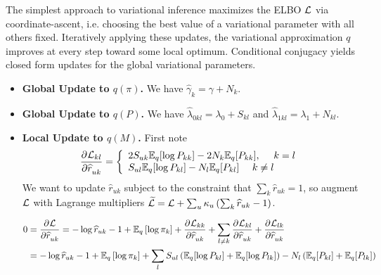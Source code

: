\documentclass{article}
\begin{document}
\newpage

 The simplest approach to variational inference maximizes the ELBO $\mathcal{L}$ via coordinate-ascent, i.e. choosing the best value of a variational parameter with all others fixed. Iteratively applying these updates, the variational approximation $q$ improves at every step toward some local optimum. Conditional conjugacy yields closed form updates for the global variational parameters. 

\begin{itemize}
\item {\bf Global Update to $q(\pi)$.} We have $\widehat \gamma_{k} = \gamma + N_k$.
\item {\bf Global Update to $q(P)$.} We have $\widehat \lambda_{0kl} = \lambda_0 + S_{kl}$ and $\widehat \lambda_{1kl} = \lambda_1 + N_{kl}$.
\item {\bf Local Update to $q(M)$.} First note 
$$ 
\frac{\partial^{}\mathcal{L}_{kl}}{\partial \widehat r_{uk}^{}} 
= \left\{
                \begin{array}{ll}
2S_{uk}\mathbb{E}_q[\log P_{kk}]
   - 2N_k \mathbb{E}_q[P_{kk}],
  ~~~~ k=l \\
S_{ul} \mathbb{E}_q[\log P_{kl}] - N_l\mathbb{E}_q[P_{kl}]
  ~~~~ k\neq l
                \end{array}
              \right.
$$
We want to update $\widehat r_{uk}$ subject to the constraint that $\sum_k \widehat r_{uk} = 1$, so augment $\mathcal{L}$ with Lagrange multipliers $\widetilde{\mathcal{L}} = \mathcal{L} + \sum_u\kappa_u\left(\sum_k \widehat r_{uk} - 1\right)$.

\begin{align*}
0 
&= \frac{\partial^{}\mathcal{L}}{\partial \widehat r_{uk}^{}}
= -\log \widehat r_{uk} - 1 + \mathbb{E}_q\left[\log \pi_k\right] + \frac{\partial^{}\mathcal{L}_{kk}}{\partial \widehat r_{uk}^{}} + \sum_{l\neq k}\frac{\partial^{}\mathcal{L}_{kl}}{\partial \widehat r_{uk}^{}} + \frac{\partial^{}\mathcal{L}_{lk}}{\partial \widehat r_{uk}^{}} \\
&= -\log \widehat r_{uk} - 1 + \mathbb{E}_q\left[\log \pi_k\right] + \sum_{l} S_{ul}\left(\mathbb{E}_q[\log P_{kl}] + \mathbb{E}_q[\log P_{lk}]\right) - N_l\left(\mathbb{E}_q[P_{kl}] + \mathbb{E}_q[P_{lk}]\right)\\
\end{align*}


\end{itemize}

\end{document}
